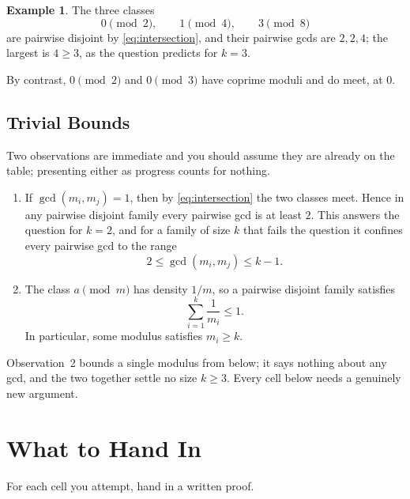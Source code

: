 \documentclass[11pt]{article}
\theoremstyle{definition}
\newtheorem*{example}{Example}
\newcommand{\cls}[2]{#1 \pmod{#2}}
\begin{document}
\begin{example}
The three classes
\[
  \cls{0}{2}, \qquad \cls{1}{4}, \qquad \cls{3}{8}
\]
are pairwise disjoint by \eqref{eq:intersection}, and their pairwise
gcds are $2, 2, 4$; the largest is $4 \geq 3$, as the question
predicts for $k = 3$.

By contrast, $\cls{0}{2}$ and $\cls{0}{3}$ have coprime moduli and do
meet, at $0$.
\end{example}

\subsection*{Trivial Bounds}

Two observations are immediate and you should assume they are already
on the table; presenting either as progress counts for nothing.

\begin{enumerate}[leftmargin=*]
  \item If $\gcd(m_i, m_j) = 1$, then by \eqref{eq:intersection} the
    two classes meet. Hence in any pairwise disjoint family every
    pairwise gcd is at least $2$. This answers the question for
    $k = 2$, and for a family of size $k$ that fails the question it
    confines every pairwise gcd to the range
    \[
      2 \leq \gcd(m_i, m_j) \leq k - 1.
    \]
  \item The class $\cls{a}{m}$ has density $1/m$, so a pairwise
    disjoint family satisfies
    \[
      \sum_{i=1}^{k} \frac{1}{m_i} \leq 1.
    \]
    In particular, some modulus satisfies $m_i \geq k$.
\end{enumerate}

Observation~2 bounds a single modulus from below; it says nothing
about any gcd, and the two together settle no size $k \geq 3$. Every
cell below needs a genuinely new argument.

\section*{What to Hand In}

For each cell you attempt, hand in a written proof.
\end{document}
